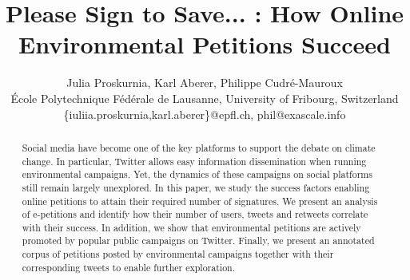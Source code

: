 \documentclass[letterpaper]{article}
\begin{document}

\title{Please Sign to Save... : How Online Environmental Petitions Succeed}

%
\author{
%
%
Julia Proskurnia, Karl Aberer, Philippe Cudr\'{e}-Mauroux \\
\'{E}cole Polytechnique F\'{e}d\'{e}rale de Lausanne, University of Fribourg, Switzerland \\ 
\{iuliia.proskurnia,karl.aberer\}@epfl.ch, phil@exascale.info \\
}

\maketitle


\begin{abstract}

Social media have become one of the key platforms to support the debate on climate change.
In particular, Twitter allows easy information dissemination when running environmental campaigns.
Yet, the dynamics of these campaigns on social platforms still remain largely unexplored.
In this paper, we study the success factors enabling online petitions to attain their required number of signatures.
We present an analysis of e-petitions and identify how their number of users, tweets and retweets correlate with their success.
In addition, we show that environmental petitions are actively promoted by popular public campaigns on Twitter.
Finally, we present an annotated corpus of petitions posted by environmental campaigns together with their corresponding tweets to enable further exploration.

\end{abstract}
\end{document}

